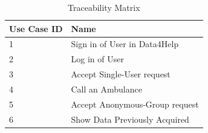       \begin{table}[h!]
        \centering
        \begin{tabularx}{\linewidth}{|X|X|}
          \hline

          \textbf{Use Case ID} & \textbf{Name}  \\
        	\hline

        	1 & Sign in of User in Data4Help\\
        	\hline

        	2 & Log in of User\\
        	\hline

        	3 & Accept Single-User request\\
        	\hline

        	4 & Call an Ambulance\\
        	\hline

        	5 & Accept Anonymous-Group request\\
        	\hline

        	6 & Show Data Previously Acquired\\
          \hline

  	    \end{tabularx}
        \caption{Traceability Matrix}
      \end{table}

  

